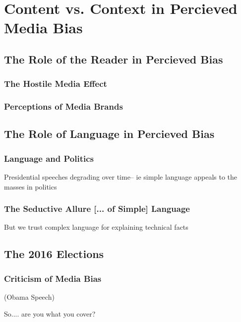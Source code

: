 \chapter{Content vs. Context in Percieved Media Bias}

\section{The Role of the Reader in Percieved Bias}
\subsection{The Hostile Media Effect}
\subsection{Perceptions of Media Brands}


\section{The Role of Language in Percieved Bias} 
\subsection{Language and Politics}
Presidential speeches degrading over time-- ie simple language appeals to the masses in politics
\subsection{The Seductive Allure [... of Simple] Language}
But we trust complex language for explaining technical facts


\section{The 2016 Elections} 
\subsection{Criticism of Media Bias} 
(Obama Speech)

So.... are you what you cover?








